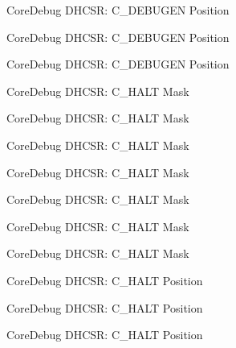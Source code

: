 \begin{DoxyRefList}
\label{deprecated__deprecated000325}%
%
Core\+Debug D\+H\+C\+SR\+: C\+\_\+\+D\+E\+B\+U\+G\+EN Position 

\label{deprecated__deprecated000401}%
%
Core\+Debug D\+H\+C\+SR\+: C\+\_\+\+D\+E\+B\+U\+G\+EN Position 

\label{deprecated__deprecated000490}%
%
Core\+Debug D\+H\+C\+SR\+: C\+\_\+\+D\+E\+B\+U\+G\+EN Position  
\item[Member \mbox{\hyperlink{group__CMSIS__CoreDebug_ga1d905a3aa594eb2e8bb78bcc4da05b3f}{Core\+Debug\+\_\+\+D\+H\+C\+S\+R\+\_\+\+C\+\_\+\+H\+A\+L\+T\+\_\+\+Msk}} ]\label{deprecated__deprecated000038}%
%
Core\+Debug D\+H\+C\+SR\+: C\+\_\+\+H\+A\+LT Mask 

\label{deprecated__deprecated000126}%
%
Core\+Debug D\+H\+C\+SR\+: C\+\_\+\+H\+A\+LT Mask 

\label{deprecated__deprecated000182}%
%
Core\+Debug D\+H\+C\+SR\+: C\+\_\+\+H\+A\+LT Mask 

\label{deprecated__deprecated000265}%
%
Core\+Debug D\+H\+C\+SR\+: C\+\_\+\+H\+A\+LT Mask 

\label{deprecated__deprecated000324}%
%
Core\+Debug D\+H\+C\+SR\+: C\+\_\+\+H\+A\+LT Mask 

\label{deprecated__deprecated000400}%
%
Core\+Debug D\+H\+C\+SR\+: C\+\_\+\+H\+A\+LT Mask 

\label{deprecated__deprecated000489}%
%
Core\+Debug D\+H\+C\+SR\+: C\+\_\+\+H\+A\+LT Mask  
\item[Member \mbox{\hyperlink{group__CMSIS__CoreDebug_gaddf1d43f8857e4efc3dc4e6b15509692}{Core\+Debug\+\_\+\+D\+H\+C\+S\+R\+\_\+\+C\+\_\+\+H\+A\+L\+T\+\_\+\+Pos}} ]\label{deprecated__deprecated000037}%
%
Core\+Debug D\+H\+C\+SR\+: C\+\_\+\+H\+A\+LT Position 

\label{deprecated__deprecated000125}%
%
Core\+Debug D\+H\+C\+SR\+: C\+\_\+\+H\+A\+LT Position 

\label{deprecated__deprecated000181}%
%
Core\+Debug D\+H\+C\+SR\+: C\+\_\+\+H\+A\+LT Position 


\end{DoxyRefList}
